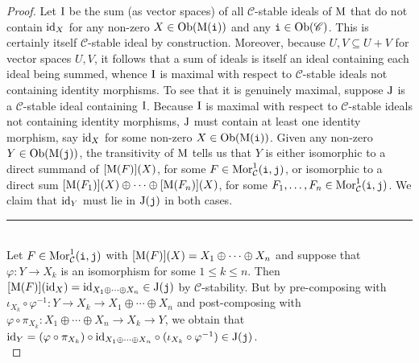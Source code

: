 \noindent\begin{proof} Let $\textnormal{I}$ be the sum (as vector spaces) of all $\mathscr{C}$-stable ideals of $\textnormal{M}$ that do not contain $\textnormal{id}_X$ for any non-zero $X \in \textnormal{Ob}(\textnormal{M}(\textnormal{\texttt{i}}))$ and any $\textnormal{\texttt{i}} \in \textnormal{Ob}(\mathscr{C})$. This is certainly itself $\mathscr{C}$-stable ideal by construction. Moreover, because $U, V \subseteq U + V$ for vector spaces $U, V$, it follows that a sum of ideals is itself an ideal containing each ideal being summed, whence $\textnormal{I}$ is maximal with respect to $\mathscr{C}$-stable ideals not containing identity morphisms. To see that it is genuinely maximal, suppose $\textnormal{J}$ is a $\mathscr{C}$-stable ideal containing $\textnormal{I}$. %
Because $\textnormal{I}$ is maximal with respect to $\mathscr{C}$-stable ideals not containing identity morphisms, $\textnormal{J}$ must contain at least one identity morphism, say $\textnormal{id}_X$ for some non-zero $X \in \textnormal{Ob}(\textnormal{M}(\textnormal{\texttt{i}}))$. Given any non-zero $Y \in \textnormal{Ob}(\textnormal{M}(\textnormal{\texttt{j}}))$, the transitivity of $\textnormal{M}$ tells us that $Y$ is either isomorphic to a direct summand of $[\textnormal{M}(F)](X)$, for some $F \in \textnormal{Mor}_\mathcal{C}^1(\textnormal{\texttt{i}}, \textnormal{\texttt{j}})$, or isomorphic to a direct sum $[\textnormal{M}(F_1)](X) \oplus \cdots \oplus [\textnormal{M}(F_n)](X)$, for some $F_1, \dots, F_n \in \textnormal{Mor}_\mathcal{C}^1(\textnormal{\texttt{i}}, \textnormal{\texttt{j}})$. We claim that $\textnormal{id}_Y$ must lie in $\textnormal{J}(\textnormal{\texttt{j}})$ in both cases.\\[-1.5\baselineskip]
\begin{center}
\rule{0.5\linewidth}{1pt}
\end{center}
\noindent\\[-\baselineskip]
\noindent Let $F \in \textnormal{Mor}_\mathcal{C}^1(\textnormal{\texttt{i}}, \textnormal{\texttt{j}})$ with $[\textnormal{M}(F)](X) = X_1 \oplus \cdots \oplus X_n$ and suppose that $\varphi : Y \to X_k$ is an isomorphism for some $1 \leq k \leq n$. Then $[\textnormal{M}(F)](\textnormal{id}_X) = \textnormal{id}_{X_1 \oplus \cdots \oplus X_n} \in \textnormal{J}(\textnormal{\texttt{j}})$ by $\mathscr{C}$-stability. But by pre-composing with $\iota_{X_k} \circ \varphi^{-1} : Y \to X_k \to X_1 \oplus \cdots \oplus X_n$ and post-composing with $\varphi \circ \pi_{X_k} : X_1 \oplus \cdots \oplus X_n \to X_k \to Y$, we obtain that $\textnormal{id}_Y = (\varphi \circ \pi_{X_k}) \circ \textnormal{id}_{X_1 \oplus \cdots \oplus X_n} \circ (\iota_{X_k} \circ \varphi^{-1}) \in \textnormal{J}(\textnormal{\texttt{j}})$.\\[-1.5\baselineskip]

\end{proof}
